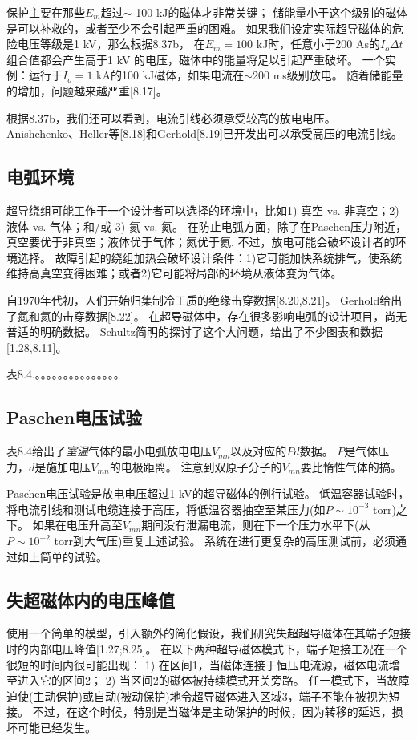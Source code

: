 保护主要在那些$E_m$超过$\sim$ 100 kJ的磁体才非常关键；
储能量小于这个级别的磁体是可以补救的，或者至少不会引起严重的困难。
如果我们设定实际超导磁体的危险电压等级是1 kV，那么根据8.37b，
在$E_m=100$ kJ时，任意小于200 As的$I_o\Delta t$组合值都会产生高于1 kV
的电压，磁体中的能量将足以引起严重破坏。
一个实例：运行于$I_o=1$ kA的100 kJ磁体，如果电流在$\sim$200 ms级别放电。
随着储能量的增加，问题越来越严重[8.17]。

根据8.37b，我们还可以看到，电流引线必须承受较高的放电电压。
Anishchenko、Heller等[8.18]和Gerhold[8.19]已开发出可以承受高压的电流引线。

\subsection{电弧环境}
超导绕组可能工作于一个设计者可以选择的环境中，比如1) 真空 vs. 非真空；2) 液体 vs. 气体；和/或 3) 氦 vs. 氮。
在防止电弧方面，除了在Paschen压力附近，真空要优于非真空；液体优于气体；氮优于氦.
不过，放电可能会破坏设计者的环境选择。
故障引起的绕组加热会破坏设计条件：1)它可能加快系统排气，使系统维持高真空变得困难；或者2)它可能将局部的环境从液体变为气体。

自1970年代初，人们开始归集制冷工质的绝缘击穿数据[8.20,8.21]。
Gerhold给出了氮和氦的击穿数据[8.22]。
在超导磁体中，存在很多影响电弧的设计项目，尚无普适的明确数据。
Schultz简明的探讨了这个大问题，给出了不少图表和数据[1.28,8.11]。

表8.4.。。。。。。。。。。。。。。。

\subsection{Paschen电压试验}
表8.4给出了\textit{室温}气体的最小电弧放电电压$V_{mn}$以及对应的$Pd$数据。
$P$是气体压力，$d$是施加电压$V_{mn}$的电极距离。
注意到双原子分子的$V_{mn}$要比惰性气体的搞。

Paschen电压试验是放电电压超过1 kV的超导磁体的例行试验。
低温容器试验时，将电流引线和测试电缆连接于高压，将低温容器抽空至某压力(如$P\sim 10^{-3}$ torr)之下。
如果在电压升高至$V_{mn}$期间没有泄漏电流，则在下一个压力水平下(从$P\sim 10^{-2}$ torr到大气压)重复上述试验。
系统在进行更复杂的高压测试前，必须通过如上简单的试验。

\subsection{失超磁体内的电压峰值}
使用一个简单的模型，引入额外的简化假设，我们研究失超超导磁体在其端子短接时的内部电压峰值[1.27;8.25]。
在以下两种超导磁体模式下，端子短接工况在一个很短的时间内很可能出现：
1) 在区间1，当磁体连接于恒压电流源，磁体电流增至进入它的区间2；
2) 当区间2的磁体被持续模式开关旁路。
任一模式下，当故障迫使(主动保护)或自动(被动保护)地令超导磁体进入区域3，端子不能在被视为短接。
不过，在这个时候，特别是当磁体是主动保护的时候，因为转移的延迟，损坏可能已经发生。

